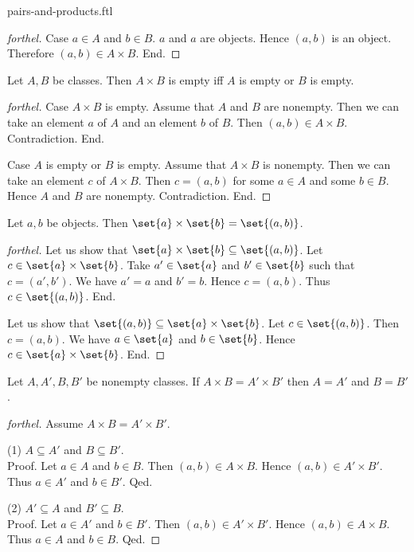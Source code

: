 \documentclass{naproche-library}
\begin{document}
\begin{smodule}{pairs-and-products.ftl}
\begin{proof}[forthel]
    Case $a \in A$ and $b \in B$.
      $a$ and $a$ are objects.
      Hence $(a, b)$ is an object.
      Therefore $(a, b) \in A \times B$.
    End.
  \end{proof}

  \begin{proposition}[forthel,id=FOUNDATIONS_04_2198552029691904,printid]
    Let $A, B$ be classes.
    Then $A \times B$ is empty iff $A$ is empty or $B$ is empty.
  \end{proposition}
  \begin{proof}[forthel]
    Case $A \times B$ is empty.
      Assume that $A$ and $B$ are nonempty.
      Then we can take an element $a$ of $A$ and an element $b$ of $B$.
      Then $(a, b) \in A \times B$.
      Contradiction.
    End.

    Case $A$ is empty or $B$ is empty.
      Assume that $A \times B$ is nonempty.
      Then we can take an element $c$ of $A \times B$.
      Then $c = (a, b)$ for some $a \in A$ and some $b \in B$.
      Hence $A$ and $B$ are nonempty.
      Contradiction.
    End.
  \end{proof}

  \begin{proposition}[forthel,id=FOUNDATIONS_04_7971087096741888,printid]
    Let $a, b$ be objects.
    Then $\set{a} \times \set{b} = \set{(a, b)}$.
  \end{proposition}
  \begin{proof}[forthel]
    Let us show that $\set{a} \times \set{b} \subseteq \set{(a, b)}$.
      Let $c \in \set{a} \times \set{b}$.
      Take $a' \in \set{a}$ and $b' \in \set{b}$ such that $c = (a', b')$.
      We have $a' = a$ and $b' = b$.
      Hence $c = (a, b)$.
      Thus $c \in \set{(a, b)}$.
    End.

    Let us show that $\set{(a, b)} \subseteq \set{a} \times \set{b}$.
      Let $c \in \set{(a, b)}$.
      Then $c = (a, b)$.
      We have $a \in \set{a}$ and $b \in \set{b}$.
      Hence $c \in \set{a} \times \set{b}$.
    End.
  \end{proof}

  \begin{proposition}[forthel,id=FOUNDATIONS_04_7456594440749056,printid]
    Let $A, A', B, B'$ be nonempty classes.
    If $A \times B = A' \times B'$ then $A = A'$ and $B = B'$.
  \end{proposition}
  \begin{proof}[forthel]
    Assume $A \times B = A' \times B'$.

    (1) $A \subseteq A'$ and $B \subseteq B'$. \\
    Proof.
      Let $a \in A$ and $b \in B$.
      Then $(a,b) \in A \times B$.
      Hence $(a,b) \in A' \times B'$.
      Thus $a \in A'$ and $b \in B'$.
    Qed.

    (2) $A' \subseteq A$ and $B' \subseteq B$. \\
    Proof.
      Let $a \in A'$ and $b \in B'$.
      Then $(a,b) \in A' \times B'$.
      Hence $(a,b) \in A \times B$.
      Thus $a \in A$ and $b \in B$.
    Qed.
  \end{proof}
\end{smodule}
\end{document}
